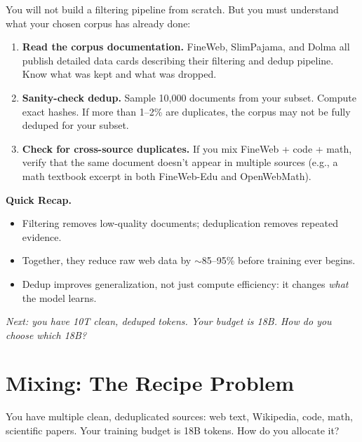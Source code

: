 \begin{tcolorbox}[colback=orange!5, colframe=orange!60, title=\textbf{For Project~2: Verify Your Corpus}]
You will not build a filtering pipeline from scratch. But you must understand what your chosen corpus has already done:

\begin{enumerate}[nosep]
  \item \textbf{Read the corpus documentation.} FineWeb, SlimPajama, and Dolma all publish detailed data cards describing their filtering and dedup pipeline. Know what was kept and what was dropped.
  \item \textbf{Sanity-check dedup.} Sample 10,000 documents from your subset. Compute exact hashes. If more than 1--2\% are duplicates, the corpus may not be fully deduped for your subset.
  \item \textbf{Check for cross-source duplicates.} If you mix FineWeb + code + math, verify that the same document doesn't appear in multiple sources (e.g., a math textbook excerpt in both FineWeb-Edu and OpenWebMath).
\end{enumerate}
\end{tcolorbox}

\begin{quickrecap}
\textbf{Quick Recap.}
\begin{itemize}[nosep,leftmargin=1.5em]
  \item Filtering removes low-quality documents; deduplication removes repeated evidence.
  \item Together, they reduce raw web data by $\sim$85--95\% before training ever begins.
  \item Dedup improves generalization, not just compute efficiency: it changes \emph{what} the model learns.
\end{itemize}
\textit{Next: you have 10T clean, deduped tokens. Your budget is 18B. How do you choose which 18B?}
\end{quickrecap}


\section{Mixing: The Recipe Problem}
\label{sec:mixing}

You have multiple clean, deduplicated sources: web text, Wikipedia, code, math, scientific papers. Your training budget is 18B tokens. How do you allocate it?


